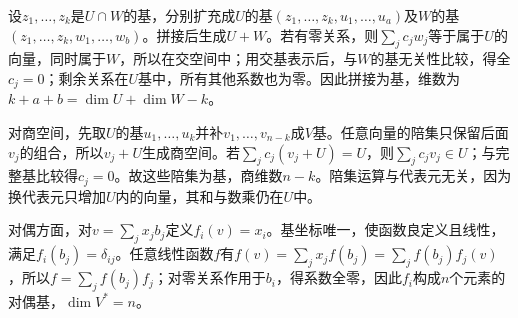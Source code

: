 \label{der:7-3}
设$z_1,\ldots,z_k$是$U\cap W$的基，分别扩充成$U$的基$(z_1,\ldots,z_k,u_1,\ldots,u_a)$及$W$的基$(z_1,\ldots,z_k,w_1,\ldots,w_b)$。拼接后生成$U+W$。若有零关系，则$\sum_j c_jw_j$等于属于$U$的向量，同时属于$W$，所以在交空间中；用交基表示后，与$W$的基无关性比较，得全$c_j=0$；剩余关系在$U$基中，所有其他系数也为零。因此拼接为基，维数为$k+a+b=\dim U+\dim W-k$。

对商空间，先取$U$的基$u_1,\ldots,u_k$并补$v_1,\ldots,v_{n-k}$成$V$基。任意向量的陪集只保留后面$v_j$的组合，所以$v_j+U$生成商空间。若$\sum_j c_j(v_j+U)=U$，则$\sum_jc_jv_j\in U$；与完整基比较得$c_j=0$。故这些陪集为基，商维数$n-k$。陪集运算与代表元无关，因为换代表元只增加$U$内的向量，其和与数乘仍在$U$中。

对偶方面，对$v=\sum_jx_jb_j$定义$f_i(v)=x_i$。基坐标唯一，使函数良定义且线性，满足$f_i(b_j)=\delta_{ij}$。任意线性函数$f$有$f(v)=\sum_jx_j f(b_j)=\sum_j f(b_j)f_j(v)$，所以$f=\sum_jf(b_j)f_j$；对零关系作用于$b_i$，得系数全零，因此$f_i$构成$n$个元素的对偶基，$\dim V^*=n$。
